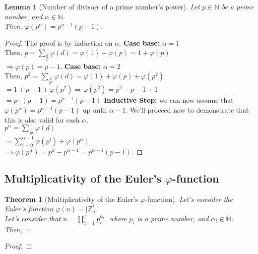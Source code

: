 \documentclass[12pt, a4paper, english]{report}
\newtheorem{theorem}{Theorem}
\newtheorem{lemma}{Lemma}
\begin{document}
\begin{lemma}[Number of divisors of a prime number's power]
    Let $p \in \mathbb{N}$  be a prime number, and $\alpha \in \mathbb{N}$.\\
    Then, $\varphi(p^{\alpha}) = p^{\alpha - 1}(p - 1)$.\newline
\end{lemma}
\begin{proof}
    The proof is by induction on $\alpha$.\newline
    \textbf{Case base:} $\alpha = 1$\\
    Then, $p = \sum_{\frac{d}{p}} \varphi(d) = \varphi(1) + \varphi(p) = 1 + \varphi(p)$\\
    $\Rightarrow \varphi(p) = p - 1$.\newline
    \textbf{Case base:} $\alpha = 2$\\
    Then, $p^{2} = \sum_{\frac{d}{p^{2}}} \varphi(d) = \varphi(1) + \varphi(p) + \varphi(p^{2})$\\
    $= 1 + p - 1 + \varphi(p^{2}) \Rightarrow \varphi(p^{2}) = p^{2} - p - 1 + 1$\\
    $= p \cdot (p - 1) = p^{\alpha - 1}(p - 1)$\newline
    \textbf{Inductive Step:} we can now assume that $\varphi(p^{\alpha}) = p^{\alpha - 1}(p - 1)$ up until $\alpha - 1$. We'll proceed now to demonstrate that this is also valid for each $\alpha$.\\
    $p^{\alpha} = \sum_{\frac{d}{p^{\alpha}}} \varphi(d)$\\
    $= \sum_{i = 0}^{\alpha - 1} \varphi(p^{i}) + \varphi(p^{\alpha})$\\
    $\Rightarrow \varphi(p^{\alpha}) = p^{\alpha} - p^{\alpha - 1} = p^{\alpha - 1}(p - 1)$.\newline
\end{proof}

\subsection{Multiplicativity of the Euler's $\varphi$-function}
\begin{theorem}[Multiplicativity of the Euler's $\varphi$-function]
    Let's consider the Euler's function $\varphi(n) = |\mathbb{Z}_{n}^{*}$.\\
    Let's consider that $n = \prod_{i=1}^{r} p_{i}^{\alpha_{i}}$, where $p_{i}$ is a prime number, and $\alpha_{i} \in \mathbb{N}$.\\
    Then, $=$
\end{theorem}
\begin{proof}
\end{proof}
\end{document}
